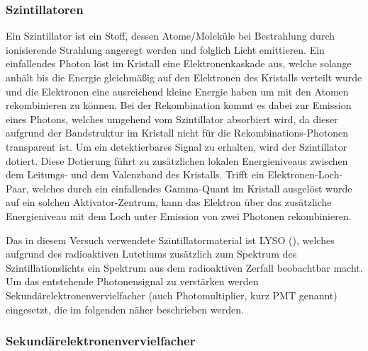 \documentclass[11pt, a4paper]{article}
\numberwithin{equation}{section}
\begin{document}
\subsubsection{Szintillatoren}

Ein Szintillator ist ein Stoff, dessen Atome/Moleküle bei Bestrahlung durch ionisierende Strahlung angeregt werden und folglich Licht emittieren.
Ein einfallendes Photon löst im Kristall eine Elektronenkaskade aus, welche solange anhält bis die Energie gleichmäßig auf den Elektronen des Kristalls verteilt wurde und die Elektronen eine ausreichend kleine Energie haben um mit den Atomen rekombinieren zu können.
Bei der Rekombination kommt es dabei zur Emission eines Photons, welches umgehend vom Szintillator absorbiert wird, da dieser aufgrund der Bandstruktur im Kristall nicht für die Rekombinations-Photonen transparent ist.
Um ein detektierbares Signal zu erhalten, wird der Szintillator dotiert.
Diese Dotierung führt zu zusätzlichen lokalen Energieniveaus zwischen dem Leitungs- und dem Valenzband des Kristalls.
Trifft ein Elektronen-Loch-Paar, welches durch ein einfallendes Gamma-Quant im Kristall ausgelöst wurde auf ein solchen Aktivator-Zentrum, kann das Elektron über das zusätzliche Energieniveau mit dem Loch unter Emission von zwei Photonen rekombinieren.

Das in diesem Versuch verwendete Szintillator\-material ist LYSO (), welches aufgrund des radioaktiven Lute\-tiums zusätzlich zum Spektrum des Szin\-tillations\-lichts ein Spektrum aus dem radioaktiven Zerfall beobachtbar macht.
Um das entstehende Photonensignal zu verstärken werden Sekundärelektronenvervielfacher (auch Photomultiplier, kurz PMT genannt) eingesetzt, die im folgenden näher beschrieben werden.

\subsubsection{Sekundärelektronenvervielfacher}
\end{document}
